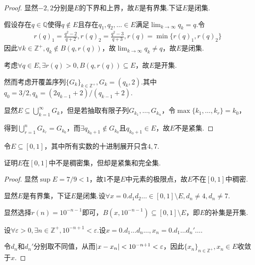 \begin{proof}
    显然\(-2,2\)分别是\(E\)的下界和上界，故\(E\)是有界集.下证\(E\)是闭集.

    假设存在\(q \in \mathbb{Q}\)使得\(q \notin E\)且存在\(q_1, q_2, \dots \in E\)满足\(\lim_{k \to \infty} q_k=q\).令
    \begin{align*}
        r(q)_1=\frac{q^2-2}{q+2}, r(q)_2=\frac{q^2-3}{q+3}, r(q)=\min\{r(q)_1, r(q)_2\}
    \end{align*}
    因此\(\forall k \in \mathbb{Z}^+, q_k \notin B(q,r(q))\)，故\(\lim_{k \to \infty} q_k \ne q\)，故\(E\)是闭集.

    考虑\(\forall q \in E, \exists r(q)>0, B(q,r(q)) \subseteq E\)，故\(E\)是开集.

    然而考虑开覆盖序列\(\{G_k\}_{k \in \mathbb{Z}^+}, G_k=(q_k,2)\).其中\(q_0=3/2, q_k=(2q_{k-1}+2)/(q_{k-1}+2)\).

    显然\(E \subseteq \bigcup_{k=1}^\infty G_k\)，但是若抽取有限子列\(G_{k_1}, \dots, G_{k_n}\)，令\(\max\{k_1, \dots, k_r\}=k_0\)，

    得到\(\bigcup_{r=1}^n G_{k_r}=G_{k_0}\)，而\(\exists q_{k_0+1} \notin G_{k_0}\)且\(q_{k_0+1} \in E\)，故\(E\)不是紧集.
\end{proof}

\begin{problem}[17]\label{1.B.17}
    令\(E \subseteq [0,1]\)，其中所有实数的十进制展开只含\(4,7\).
    
    证明\(E\)在\([0,1]\)中不是稠密集，但却是紧集和完全集.
\end{problem}

\begin{proof}
    显然\(\sup E=7/9<1\)，故\(1\)不是\(E\)中元素的极限点，故\(E\)不在\([0,1]\)中稠密.

    显然\(E\)是有界集，下证\(E\)是闭集.设\(\forall x=0.d_1d_2\dots \in [0,1] \setminus E, d_n \ne 4, d_n \ne 7\).

    显然选择\(r(n)=10^{-n-1}\)即可，\(B(x, 10^{-n-1}) \subseteq [0,1] \setminus E\)，即\(E\)的补集是开集.

    设\(\forall \varepsilon>0, \exists n \in \mathbb{Z}^+, 10^{-n+1}<\varepsilon\).设\(x=0.d_1 \dots d_n \dots, x_n=0.d_1 \dots d_n' \dots\).

    令\(d_n\)和\(d_n'\)分别取不同值，从而\(\abs*{x-x_n}<10^{-n+1}<\varepsilon\)，因此\(\{x_n\}_{n \in \mathbb{Z}^+}, x_n \in E\)收敛于\(x\).
\end{proof}

\newpage

